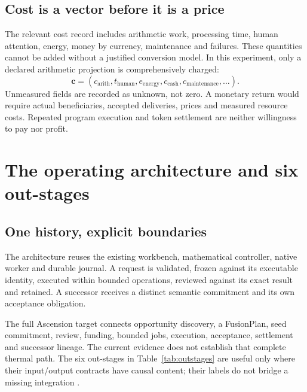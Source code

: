 \documentclass[11pt,a4paper]{article}
\begin{document}
\subsection{Cost is a vector before it is a price}
The relevant cost record includes arithmetic work, processing time, human attention, energy, money by currency, maintenance and failures. These quantities cannot be added without a justified conversion model. In this experiment, only a declared arithmetic projection is comprehensively charged:
\[
\mathbf{c}=(c_{\mathrm{arith}},t_{\mathrm{human}},e_{\mathrm{energy}},
c_{\mathrm{cash}},c_{\mathrm{maintenance}},\ldots).
\]
Unmeasured fields are recorded as unknown, not zero. A monetary return would require actual beneficiaries, accepted deliveries, prices and measured resource costs. Repeated program execution and token settlement are neither willingness to pay nor profit.

\section{The operating architecture and six out-stages}\label{sec:architecture}
\subsection{One history, explicit boundaries}
The architecture reuses the existing workbench, mathematical controller, native worker and durable journal. A request is validated, frozen against its executable identity, executed within bounded operations, reviewed against its exact result and retained. A successor receives a distinct semantic commitment and its own acceptance obligation.

The full Ascension target connects opportunity discovery, a FusionPlan, seed commitment, review, funding, bounded jobs, execution, acceptance, settlement and successor lineage. The current evidence does not establish that complete thermal path. The six out-stages in Table~\ref{tab:outstages} are useful only where their input/output contracts have causal content; their labels do not bridge a missing integration \cite{implementationmap,executionfollowup}.
\end{document}

